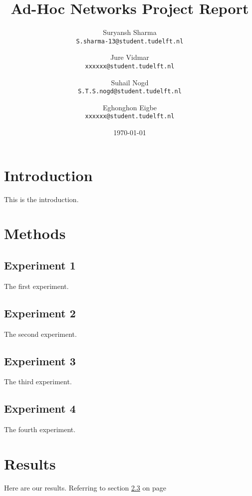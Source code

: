 \documentclass[a4paper,12pt]{article}
\begin{document}
\title{Ad-Hoc Networks Project Report}
\author{
	Suryansh Sharma \\ 
	\texttt{S.sharma-13@student.tudelft.nl}
 	\and 
	Jure Vidmar \\
	\texttt{xxxxxx@student.tudelft.nl} 
	\and
	Suhail Nogd \\
	\texttt{S.T.S.nogd@student.tudelft.nl} 	
	 \and 
	Eghonghon Eigbe\\
	\texttt{xxxxxx@student.tudelft.nl} 
}

\date {\today}
\maketitle

\section{Introduction}
This is the introduction.

\section{Methods}

\subsection{Experiment 1}
\label{sec1}
The first experiment.

\subsection{Experiment 2}
The second experiment.

\subsection{Experiment 3}
\label{sec1}
The third experiment.

\subsection{Experiment 4}
The fourth experiment.

\section{Results}
Here are our results. Referring to section \ref{sec1} on page \pageref{sec1}
\end{document}
